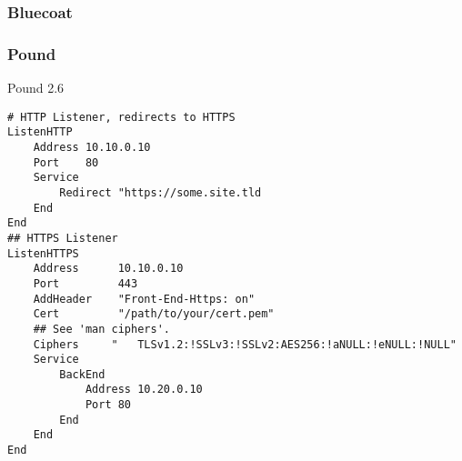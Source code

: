 \subsubsection{Bluecoat}

\subsubsection{Pound}

Pound 2.6
	
\begin{lstlisting}[breaklines]
# HTTP Listener, redirects to HTTPS
ListenHTTP
    Address 10.10.0.10
    Port    80
    Service
        Redirect "https://some.site.tld
    End
End
## HTTPS Listener
ListenHTTPS
    Address      10.10.0.10
    Port         443
    AddHeader    "Front-End-Https: on"
    Cert         "/path/to/your/cert.pem"
    ## See 'man ciphers'.
    Ciphers     "	TLSv1.2:!SSLv3:!SSLv2:AES256:!aNULL:!eNULL:!NULL"
    Service
        BackEnd
            Address 10.20.0.10
            Port 80
        End
    End
End
\end{lstlisting}